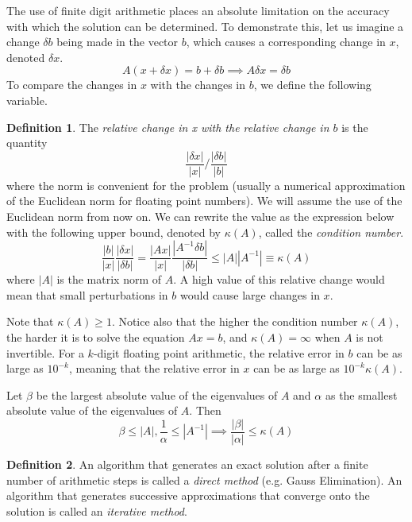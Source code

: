 \documentclass{article}
\theoremstyle{remark}
\theoremstyle{definition}
\newtheorem{definition}{Definition}[section]
\begin{document}
  The use of finite digit arithmetic places an absolute limitation on the accuracy with which the solution can be determined. To demonstrate this, let us imagine a change $\delta b$ being made in the vector $b$, which causes a corresponding change in $x$, denoted $\delta x$. 
  \[A(x + \delta x) = b + \delta b \implies A \delta x = \delta b\]
  To compare the changes in $x$ with the changes in $b$, we define the following variable. 
  \begin{definition}
  The \textit{relative change in x with the relative change in $b$} is the quantity
  \[\frac{|\delta x|}{|x|} \bigg/ \frac{|\delta b|}{|b|}\]
  where the norm is convenient for the problem (usually a numerical approximation of the Euclidean norm for floating point numbers). We will assume the use of the Euclidean norm from now on. We can rewrite the value as the expression below with the following upper bound, denoted by $\kappa (A)$, called the \textit{condition number}. 
  \[\frac{|b|}{|x|} \frac{|\delta x|}{|\delta b|} = \frac{|Ax|}{|x|} \frac{|A^{-1} \delta b|}{|\delta b|} \leq |A||A^{-1}| \equiv \kappa (A)\]
  where $|A|$ is the matrix norm of $A$. 
  A high value of this relative change would mean that small perturbations in $b$ would cause large changes in $x$.
  \end{definition}

  Note that $\kappa(A) \geq 1$. Notice also that the higher the condition number $\kappa (A)$, the harder it is to solve the equation $A x = b$, and $\kappa(A) = \infty$ when $A$ is not invertible. For a $k$-digit floating point arithmetic, the relative error in $b$ can be as large as $10^{-k}$, meaning that the relative error in $x$ can be as large as $10^{-k} \kappa (A)$. 

  Let $\beta$ be the largest absolute value of the eigenvalues of $A$ and $\alpha$ as the smallest absolute value of the eigenvalues of $A$. Then 
  \[\beta \leq |A|, \frac{1}{\alpha} \leq |A^{-1}| \implies \frac{|\beta|}{|\alpha|} \leq \kappa(A)\]


  \begin{definition}
  An algorithm that generates an exact solution after a finite number of arithmetic steps is called a \textit{direct method} (e.g. Gauss Elimination). An algorithm that generates successive approximations that converge onto the solution is called an \textit{iterative method}. 
  \end{definition}
\end{document}
